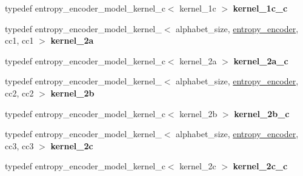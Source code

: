 \begin{DoxyCompactItemize}
\item 
\hypertarget{classdlib_1_1entropy__encoder__model_a29abf00894e8882bfb874b8f3afad42d}{
typedef entropy\_\-encoder\_\-model\_\-kernel\_\-c$<$ kernel\_\-1c $>$ {\bfseries kernel\_\-1c\_\-c}}
\label{classdlib_1_1entropy__encoder__model_a29abf00894e8882bfb874b8f3afad42d}

\item 
\hypertarget{classdlib_1_1entropy__encoder__model_a5fda4508a3ecd0a38b45093d77ad3808}{
typedef entropy\_\-encoder\_\-model\_\-kernel\_$<$ alphabet\_\-size, \hyperlink{classdlib_1_1entropy__encoder}{entropy\_\-encoder}, cc1, cc1 $>$ {\bfseries kernel\_\-2a}}
\label{classdlib_1_1entropy__encoder__model_a5fda4508a3ecd0a38b45093d77ad3808}

\item 
\hypertarget{classdlib_1_1entropy__encoder__model_a6c76cfb361686eeae870da83d1330ecf}{
typedef entropy\_\-encoder\_\-model\_\-kernel\_\-c$<$ kernel\_\-2a $>$ {\bfseries kernel\_\-2a\_\-c}}
\label{classdlib_1_1entropy__encoder__model_a6c76cfb361686eeae870da83d1330ecf}

\item 
\hypertarget{classdlib_1_1entropy__encoder__model_a2feb7caabe8e2c3519829b9f12be222a}{
typedef entropy\_\-encoder\_\-model\_\-kernel\_$<$ alphabet\_\-size, \hyperlink{classdlib_1_1entropy__encoder}{entropy\_\-encoder}, cc2, cc2 $>$ {\bfseries kernel\_\-2b}}
\label{classdlib_1_1entropy__encoder__model_a2feb7caabe8e2c3519829b9f12be222a}

\item 
\hypertarget{classdlib_1_1entropy__encoder__model_ad78ee85da043cb0fdf9242fe60dcbe01}{
typedef entropy\_\-encoder\_\-model\_\-kernel\_\-c$<$ kernel\_\-2b $>$ {\bfseries kernel\_\-2b\_\-c}}
\label{classdlib_1_1entropy__encoder__model_ad78ee85da043cb0fdf9242fe60dcbe01}

\item 
\hypertarget{classdlib_1_1entropy__encoder__model_ab1a973c444a47a3d2a97296b9f9b5fb2}{
typedef entropy\_\-encoder\_\-model\_\-kernel\_$<$ alphabet\_\-size, \hyperlink{classdlib_1_1entropy__encoder}{entropy\_\-encoder}, cc3, cc3 $>$ {\bfseries kernel\_\-2c}}
\label{classdlib_1_1entropy__encoder__model_ab1a973c444a47a3d2a97296b9f9b5fb2}

\item 
\hypertarget{classdlib_1_1entropy__encoder__model_acc50842f3c7f55e7305a5f359b2a9966}{
typedef entropy\_\-encoder\_\-model\_\-kernel\_\-c$<$ kernel\_\-2c $>$ {\bfseries kernel\_\-2c\_\-c}}
\label{classdlib_1_1entropy__encoder__model_acc50842f3c7f55e7305a5f359b2a9966}


\end{DoxyCompactItemize}
